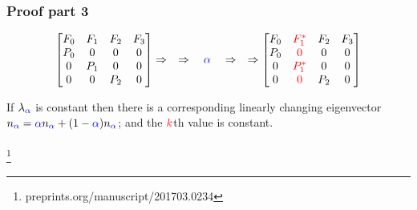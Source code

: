 \documentclass{beamer}
\newcommand\blfootnote[1]{%
  \begingroup
  \renewcommand\thefootnote{}\footnote{#1}%
  \addtocounter{footnote}{-1}%
  \endgroup
}
\begin{document}
\begin{frame}
\frametitle{Proof part 3}

\begin{equation*}
\begin{bmatrix}
    F_0 & F_1 & F_2 & F_3  \\
    P_0 &  0  &  0  &  0   \\
     0  & P_1 &  0  &  0   \\
     0  &  0  & P_2 &  0 
\end{bmatrix}
\Rightarrow\quad \Rightarrow\quad\textcolor{blue}{\alpha}\quad \Rightarrow\quad \Rightarrow
\begin{bmatrix}
    F_0 & \textcolor{red}{F^*_1} & F_2 & F_3  \\
    P_0 & \textcolor{red}{0}  &  0  &  0   \\
     0  & \textcolor{red}{P^*_1} &  0  &  0   \\
     0  & \textcolor{red}{0}  & P_2 &  0 
\end{bmatrix}
\end{equation*}

If $\lambda_{\textcolor{blue}{\alpha}}$ is constant then there is a corresponding linearly changing eigenvector $n_{{\textcolor{blue}{\alpha}}} = {\textcolor{blue}{\alpha}}n_{{\textcolor{blue}{\alpha}}} + (1-{\textcolor{blue}{\alpha}}) n_{{\textcolor{blue}{\alpha}}}$; and the $\textcolor{red}{k}$th value is constant.\\\-\\


\blfootnote{%
preprints.org/manuscript/201703.0234
}
\end{frame}
\end{document}
